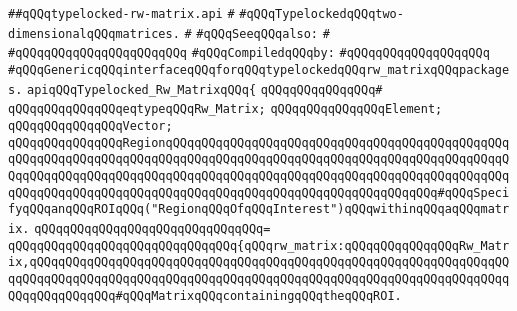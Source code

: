 \label{src/lib/std/src/typelocked-rw-matrix.api}
\verb|##qQQqtypelocked-rw-matrix.api|\newline
\verb|#|\newline
\verb|#qQQqTypelockedqQQqtwo-dimensionalqQQqmatrices.|\newline
\verb|#|\newline
\verb|#qQQqSeeqQQqalso:|\newline
\verb|#|\newline
\verb|#qQQqqQQqqQQqqQQqqQQq|\verb|qQQq|\newline
\newline
\verb|#qQQqCompiledqQQqby:|\newline
\verb|#qQQqqQQqqQQqqQQqqQQq|\newline
\newline
\newline
\newline
\verb|#qQQqGenericqQQqinterfaceqQQqforqQQqtypelockedqQQqrw_matrixqQQqpackages.|\newline
\newline
\newline
\newline
\verb|apiqQQqTypelocked_Rw_MatrixqQQq{|\newline
\verb|qQQqqQQqqQQqqQQq#|\newline
\verb|qQQqqQQqqQQqqQQqeqtypeqQQqRw_Matrix;|\newline
\verb|qQQqqQQqqQQqqQQqElement;|\newline
\verb|qQQqqQQqqQQqqQQqVector;|\newline
\newline
\verb|qQQqqQQqqQQqqQQqRegionqQQqqQQqqQQqqQQqqQQqqQQqqQQqqQQqqQQqqQQqqQQqqQQqqQQqqQQqqQQqqQQqqQQqqQQqqQQqqQQqqQQqqQQqqQQqqQQqqQQqqQQqqQQqqQQqqQQqqQQqqQQqqQQqqQQqqQQqqQQqqQQqqQQqqQQqqQQqqQQqqQQqqQQqqQQqqQQqqQQqqQQqqQQqqQQqqQQqqQQqqQQqqQQqqQQqqQQqqQQqqQQqqQQqqQQqqQQqqQQqqQQqqQQq#qQQqSpecifyqQQqanqQQqROIqQQq("RegionqQQqOfqQQqInterest")qQQqwithinqQQqaqQQqmatrix.|\newline
\verb|qQQqqQQqqQQqqQQqqQQqqQQqqQQqqQQq=|\newline
\verb|qQQqqQQqqQQqqQQqqQQqqQQqqQQqqQQq{qQQqrw_matrix:qQQqqQQqqQQqqQQqRw_Matrix,qQQqqQQqqQQqqQQqqQQqqQQqqQQqqQQqqQQqqQQqqQQqqQQqqQQqqQQqqQQqqQQqqQQqqQQqqQQqqQQqqQQqqQQqqQQqqQQqqQQqqQQqqQQqqQQqqQQqqQQqqQQqqQQqqQQqqQQqqQQqqQQqqQQqqQQq#qQQqMatrixqQQqcontainingqQQqtheqQQqROI.|\newline
